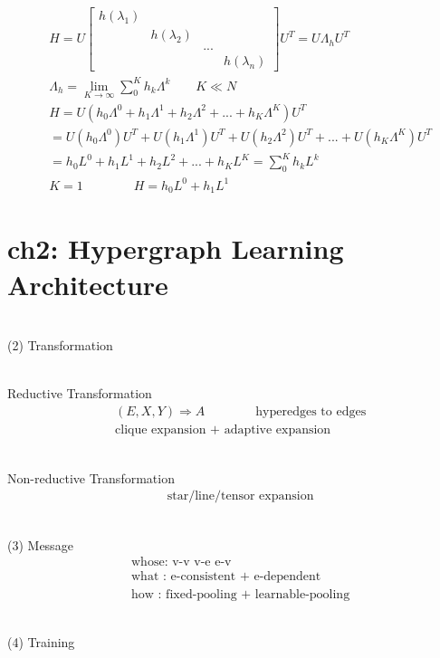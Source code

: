 \documentclass{article}
\begin{document}
%
\begin{align*}
    & H = 
        U
        \begin{bmatrix}
            h \left ( \lambda_{1} \right ) &  &  & \\
            &  h \left ( \lambda_{2} \right ) &  & \\
            &  &  ... & \\
            &  &  & h \left ( \lambda_{n} \right )
        \end{bmatrix}
        U^{T}
        = 
        U \Lambda_{h} U^{T}  \\[3pt]
    & \Lambda_{h} = 
        \lim_{K \to \infty} \sum_{0}^{K} h_{k} \Lambda^{k} \qquad K \ll N  \\[3pt]
    & H = U
    \left (
    h_{0} \Lambda^{0} +
    h_{1} \Lambda^{1} +
    h_{2} \Lambda^{2} +
    ... +
    h_{K} \Lambda^{K}
    \right )
    U^{T}  \\[3pt]
    &= 
    U \left ( h_{0} \Lambda^{0} \right ) U^{T} +
    U \left ( h_{1} \Lambda^{1} \right ) U^{T} +
    U \left ( h_{2} \Lambda^{2} \right ) U^{T} +
    ... +
    U \left ( h_{K} \Lambda^{K} \right ) U^{T} \\[3pt]
    &=
    h_{0} L^{0} +
    h_{1} L^{1} +
    h_{2} L^{2} +
    ... +
    h_{K} L^{K}
    = 
    \sum_{0}^{K} h_{k} L^{k} \\[3pt]
    & K = 1 \qquad \qquad
    H = 
h_{0} L^{0} +
h_{1} L^{1}
\end{align*}
\newpage
\section*{ch2: Hypergraph Learning Architecture}





~ \\[3pt]
(2) Transformation

~ \\[3pt]
Reductive Transformation
\begin{align*}
    & ( E, X, Y ) \Rightarrow A 
    \qquad \qquad 
    \text{hyperedges to edges} \\[3pt]
    & \text{clique expansion + adaptive expansion}
\end{align*}

~ \\[3pt]
Non-reductive Transformation
\begin{align*}
    & \text{star/line/tensor expansion}
\end{align*}


~ \\[3pt]
(3) Message
\begin{align*}
    & \text{whose: v-v \ v-e \ e-v} \\[3pt]
    & \text{what : e-consistent + e-dependent} \\[3pt]
    & \text{how  : fixed-pooling + learnable-pooling} 
\end{align*}


~ \\[3pt]
(4) Training
\end{document}

